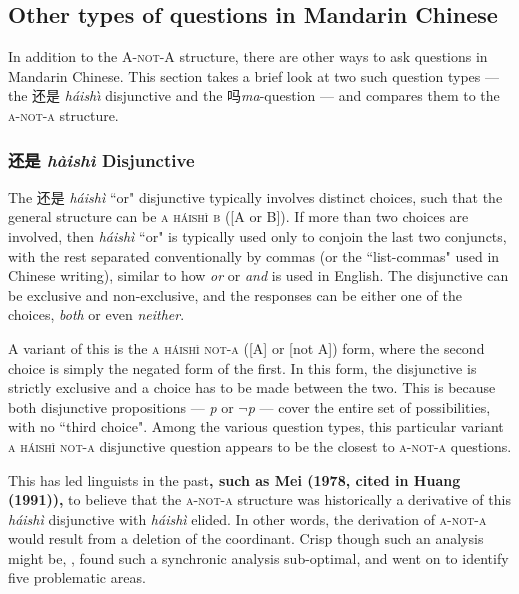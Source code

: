 \documentclass[12pt, UTF8]{article}
\begin{document}
\subsection{Other types of questions in Mandarin Chinese}
In addition to the \textsc{A-not-A} structure, there are other ways to ask questions in Mandarin Chinese. This section takes a brief look at two such question types --- the 还是 \textit{h\'{a}ish\`{\i}} disjunctive and the 吗\textit{ma}-question --- and compares them to the \textsc{a-not-a} structure.

\subsubsection{还是 \textit{h\`{a}ish\`{i}} Disjunctive}

The 还是 \textit{h\'{a}ish\`{i}} ``or" disjunctive typically involves distinct choices, such that the general structure can be \textsc{a h\'{a}ish\`{i} b} ([A or B]). If more than two choices are involved, then \textit{h\'{a}ish\`{i}} ``or" is typically used only to conjoin the last two conjuncts, with the rest separated conventionally by commas (or the ``list-commas" used in Chinese writing), similar to how \textit{or} or \textit{and} is used in English. The disjunctive can be exclusive and non-exclusive, and the responses can be either one of the choices, \textit{both} or even \textit{neither}.

A variant of this is the \textsc{a h\'{a}ish\`{i} not-a} ([A] or [not A]) form, where the second choice is simply the negated form of the first. In this form, the disjunctive is strictly exclusive and a choice has to be made between the two. This is because both disjunctive propositions --- \textit{p} or \textit{$\neg$p} ---  cover the entire set of possibilities, with no ``third choice". Among the various question types, this particular variant \textsc{a h\'{a}ish\`{i} not-a} disjunctive question appears to be the closest to \textsc{a-not-a} questions.

This has led linguists in the past\textbf{, such as Mei (1978, cited in Huang (1991)),} to believe that the \textsc{a-not-a} structure was historically a derivative of this \textit{h\'{a}ish\`{i}} disjunctive with \textit{h\'{a}ish\`{i}} elided. In other words, the derivation of \textsc{a-not-a} would result from a deletion of the coordinant. Crisp though such an analysis might be, \cite{Huang1991}, found such a synchronic analysis sub-optimal, and went on to identify five problematic areas. 
\end{document}
